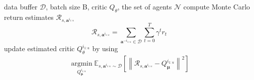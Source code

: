 \documentclass[11pt]{article}
\theoremstyle{plain}
\theoremstyle{remark}
\begin{document}
\begin{algorithm}[h!]
\caption{Critic regression on $\mathcal{D}$ following 
$\boldsymbol{\mu}=\boldsymbol{\pi}_{\rm llm}$}
\label{alg:criti_regression}
\begin{algorithmic}
     data buffer $\mathcal{D}$, batch size B, critic $Q_\theta$, the set of agents $\mathcal{N}$
    \STATE compute Monte Carlo return estimates $\mathcal{R}_{s, \boldsymbol{a}^{i_{1:u}}}$
    \begin{equation*}
        \mathcal{R}_{s, \boldsymbol{a}^{i_{1:u}}} = \sum_{\boldsymbol{a}^{-i_{1:u}} \in \mathcal{D}}\sum_{t=0}^{T}\gamma^t r_t
    \end{equation*}
    \STATE update estimated critic $Q_\theta^{i_{1:u}}$ by using
    \begin{align*}
        \mathop{\arg\min}\limits_{Q_{\boldsymbol{\mu}}^{i_{1:u}}} \mathbb{E}_{s, \boldsymbol{a}^{i_{1:u}} \sim \mathcal{D}} \left[\left\| \mathcal{R}_{s, \boldsymbol{a}^{i_{1:u}}} - Q_{\boldsymbol{\mu}}^{i_{1:u}} \right\|^{2} \right]
    \end{align*}
    \ENDFOR
    \ENDFOR
\end{algorithmic}
\end{algorithm}

\iffalse 
\end{document}

